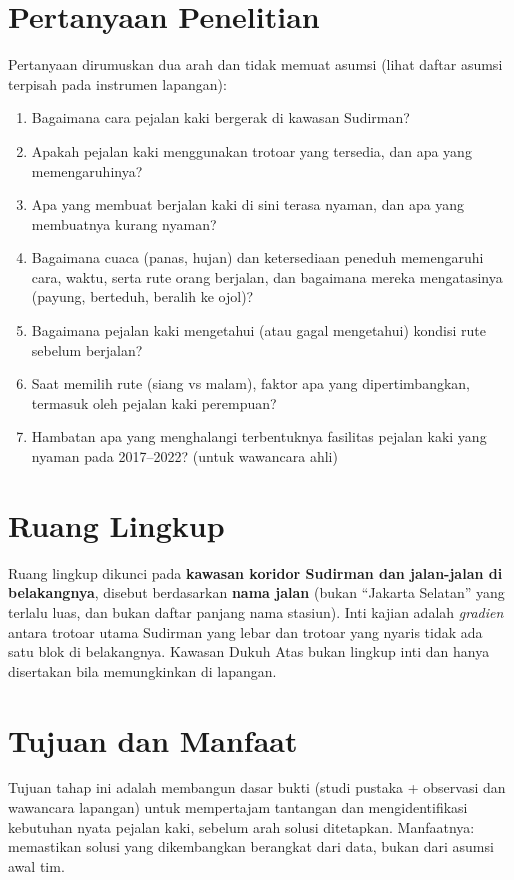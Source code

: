 \documentclass[11pt,a4paper]{report}
\begin{document}
\section{Pertanyaan Penelitian}
Pertanyaan dirumuskan dua arah dan tidak memuat asumsi (lihat daftar asumsi terpisah pada
instrumen lapangan):
\begin{enumerate}
  \item Bagaimana cara pejalan kaki bergerak di kawasan Sudirman?
  \item Apakah pejalan kaki menggunakan trotoar yang tersedia, dan apa yang memengaruhinya?
  \item Apa yang membuat berjalan kaki di sini terasa nyaman, dan apa yang membuatnya kurang
        nyaman?
  \item Bagaimana cuaca (panas, hujan) dan ketersediaan peneduh memengaruhi cara, waktu, serta
        rute orang berjalan, dan bagaimana mereka mengatasinya (payung, berteduh, beralih ke ojol)?
  \item Bagaimana pejalan kaki mengetahui (atau gagal mengetahui) kondisi rute sebelum berjalan?
  \item Saat memilih rute (siang vs malam), faktor apa yang dipertimbangkan, termasuk oleh
        pejalan kaki perempuan?
  \item Hambatan apa yang menghalangi terbentuknya fasilitas pejalan kaki yang nyaman pada
        2017--2022? (untuk wawancara ahli)
\end{enumerate}

\section{Ruang Lingkup}
Ruang lingkup dikunci pada \textbf{kawasan koridor Sudirman dan jalan-jalan di belakangnya},
disebut berdasarkan \textbf{nama jalan} (bukan ``Jakarta Selatan'' yang terlalu luas, dan bukan
daftar panjang nama stasiun). Inti kajian adalah \emph{gradien} antara trotoar utama Sudirman
yang lebar dan trotoar yang nyaris tidak ada satu blok di belakangnya. Kawasan Dukuh Atas bukan
lingkup inti dan hanya disertakan bila memungkinkan di lapangan.

\section{Tujuan dan Manfaat}
Tujuan tahap ini adalah membangun dasar bukti (studi pustaka + observasi dan wawancara lapangan)
untuk mempertajam tantangan dan mengidentifikasi kebutuhan nyata pejalan kaki, sebelum arah
solusi ditetapkan. Manfaatnya: memastikan solusi yang dikembangkan berangkat dari data, bukan
dari asumsi awal tim.
\end{document}
